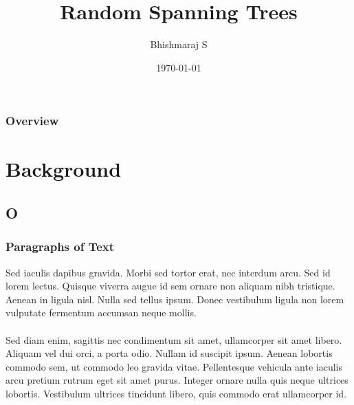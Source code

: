 \documentclass{beamer}
\title[Short title]{Random Spanning Trees} %
\author{Bhishmaraj S} %
\institute[CMI] %
{
Chennai Mathematical Institute \\ %
\medskip
\textit{bhishma@cmi.ac.in} %
}
\date{\today} %
\begin{document}
\begin{frame}
\titlepage %
\end{frame}

\begin{frame}
\frametitle{Overview} %
\tableofcontents %
\end{frame}


\section{Background} %

\subsection{O} %

\begin{frame}
\frametitle{Paragraphs of Text}
Sed iaculis dapibus gravida. Morbi sed tortor erat, nec interdum arcu. Sed id lorem lectus. Quisque viverra augue id sem ornare non aliquam nibh tristique. Aenean in ligula nisl. Nulla sed tellus ipsum. Donec vestibulum ligula non lorem vulputate fermentum accumsan neque mollis.\\~\\

Sed diam enim, sagittis nec condimentum sit amet, ullamcorper sit amet libero. Aliquam vel dui orci, a porta odio. Nullam id suscipit ipsum. Aenean lobortis commodo sem, ut commodo leo gravida vitae. Pellentesque vehicula ante iaculis arcu pretium rutrum eget sit amet purus. Integer ornare nulla quis neque ultrices lobortis. Vestibulum ultrices tincidunt libero, quis commodo erat ullamcorper id.
\end{frame}
\end{document}
